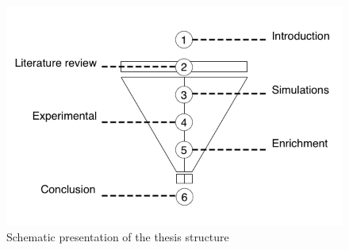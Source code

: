\begin{figure}
  \includegraphics[width=\linewidth]{figures/funnel.png}
  \caption{Schematic presentation of the thesis structure}
  \label{fig:boat1}
\end{figure}


\renewcommand{\bibname}{References}

